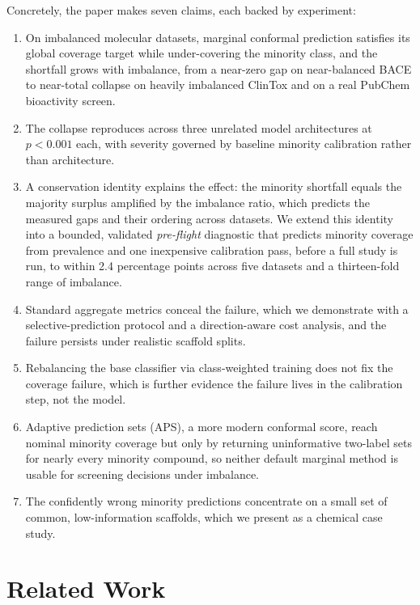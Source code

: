 \documentclass[11pt]{article}
\begin{document}
Concretely, the paper makes seven claims, each backed by experiment:

\begin{enumerate}
\item On imbalanced molecular datasets, marginal conformal prediction satisfies its global
coverage target while under-covering the minority class, and the shortfall grows with imbalance,
from a near-zero gap on near-balanced BACE to near-total collapse on heavily imbalanced ClinTox
and on a real PubChem bioactivity screen.
\item The collapse reproduces across three unrelated model architectures at $p<0.001$ each, with
severity governed by baseline minority calibration rather than architecture.
\item A conservation identity explains the effect: the minority shortfall equals the majority
surplus amplified by the imbalance ratio, which predicts the measured gaps and their ordering
across datasets. We extend this identity into a bounded, validated \emph{pre-flight} diagnostic
that predicts minority coverage from prevalence and one inexpensive calibration pass, before a
full study is run, to within 2.4 percentage points across five datasets and a thirteen-fold range
of imbalance.
\item Standard aggregate metrics conceal the failure, which we demonstrate with a
selective-prediction protocol and a direction-aware cost analysis, and the failure persists under
realistic scaffold splits.
\item Rebalancing the base classifier via class-weighted training does not fix the coverage
failure, which is further evidence the failure lives in the calibration step, not the model.
\item Adaptive prediction sets (APS), a more modern conformal score, reach nominal minority
coverage but only by returning uninformative two-label sets for nearly every minority compound, so
neither default marginal method is usable for screening decisions under imbalance.
\item The confidently wrong minority predictions concentrate on a small set of common,
low-information scaffolds, which we present as a chemical case study.
\end{enumerate}

\section{Related Work}
\end{document}
